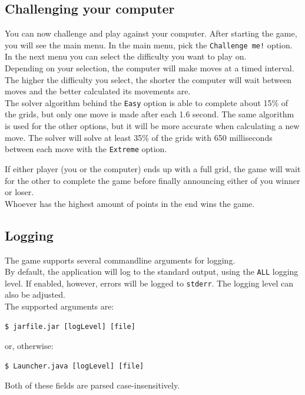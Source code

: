 \documentclass[a4paper,11pt,report]{scrartcl}
\begin{document}
\subsection{Challenging your computer}

You can now challenge and play against your computer. After starting the game, you will see the main menu. In the main menu, pick the \texttt{Challenge me!} option. In the next menu you can select the difficulty you want to play on.\\

Depending on your selection, the computer will make moves at a timed interval. The higher the difficulty you select, the shorter the computer will wait between moves and the better calculated its movements are.\\

The solver algorithm behind the \texttt{Easy} option is able to complete about 15\% of the grids, but only one move is made after each 1.6 second. The same algorithm is used for the other options, but it will be more accurate when calculating a new move. The solver will solve at least 35\% of the grids with 650 milliseconds between each move with the \texttt{Extreme} option.

If either player (you or the computer) ends up with a full grid, the game will wait for the other to complete the game before finally announcing either of you winner or loser.\\

Whoever has the highest amount of points in the end wins the game.

\subsection{Logging}
The game supports several commandline arguments for logging.\\

By default, the application will log to the standard output, using the
\texttt{ALL} logging level. If enabled, however, errors will be logged to
\texttt{stderr}. The logging level can also be adjusted.\\

The supported arguments are:
\begin{verbatim}
$ jarfile.jar [logLevel] [file]
\end{verbatim}
or, otherwise:
\begin{verbatim}
$ Launcher.java [logLevel] [file]
\end{verbatim}
Both of these fields are parsed case-insensitively.\\
\end{document}
